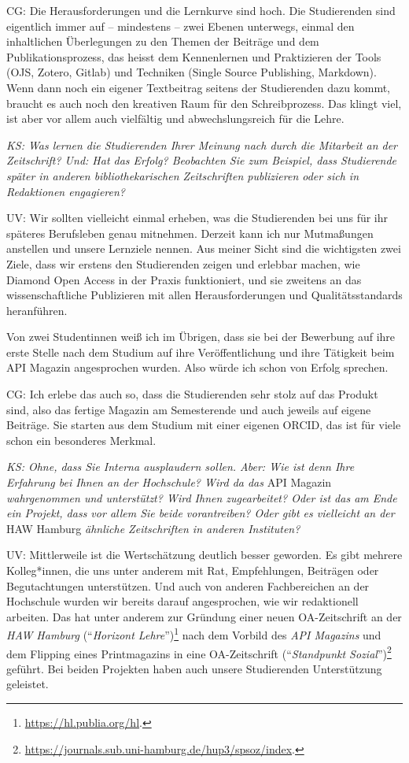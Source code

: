 \documentclass[a4paper,
fontsize=11pt,
oneside,
numbers=noperiodatend,
parskip=half-,
bibliography=totoc,
final
]{scrartcl}
\begin{document}
CG: Die Herausforderungen und die Lernkurve sind hoch. Die Studierenden
sind eigentlich immer auf -- mindestens -- zwei Ebenen unterwegs, einmal
den inhaltlichen Überlegungen zu den Themen der Beiträge und dem
Publikationsprozess, das heisst dem Kennenlernen und Praktizieren der
Tools (OJS, Zotero, Gitlab) und Techniken (Single Source Publishing,
Markdown). Wenn dann noch ein eigener Textbeitrag seitens der
Studierenden dazu kommt, braucht es auch noch den kreativen Raum für den
Schreibprozess. Das klingt viel, ist aber vor allem auch vielfältig und
abwechslungsreich für die Lehre.

\emph{KS: Was lernen die Studierenden Ihrer Meinung nach durch die
Mitarbeit an der Zeitschrift? Und: Hat das Erfolg? Beobachten Sie zum
Beispiel, dass Studierende später in anderen bibliothekarischen
Zeitschriften publizieren oder sich in Redaktionen engagieren?}

UV: Wir sollten vielleicht einmal erheben, was die Studierenden bei uns
für ihr späteres Berufsleben genau mitnehmen. Derzeit kann ich nur
Mutmaßungen anstellen und unsere Lernziele nennen. Aus meiner Sicht sind
die wichtigsten zwei Ziele, dass wir erstens den Studierenden zeigen und
erlebbar machen, wie Diamond Open Access in der Praxis funktioniert, und
sie zweitens an das wissenschaftliche Publizieren mit allen
Herausforderungen und Qualitätsstandards heranführen.

Von zwei Studentinnen weiß ich im Übrigen, dass sie bei der Bewerbung
auf ihre erste Stelle nach dem Studium auf ihre Veröffentlichung und
ihre Tätigkeit beim API Magazin angesprochen wurden. Also würde ich
schon von Erfolg sprechen.

CG: Ich erlebe das auch so, dass die Studierenden sehr stolz auf das
Produkt sind, also das fertige Magazin am Semesterende und auch jeweils
auf eigene Beiträge. Sie starten aus dem Studium mit einer eigenen
ORCID, das ist für viele schon ein besonderes Merkmal.

\emph{KS: Ohne, dass Sie Interna ausplaudern sollen. Aber: Wie ist denn
Ihre Erfahrung bei Ihnen an der Hochschule? Wird da das} API Magazin
\emph{wahrgenommen und unterstützt? Wird Ihnen zugearbeitet? Oder ist
das am Ende ein Projekt, dass vor allem Sie beide vorantreiben? Oder
gibt es vielleicht an der} HAW Hamburg \emph{ähnliche Zeitschriften in
anderen Instituten?}

UV: Mittlerweile ist die Wertschätzung deutlich besser geworden. Es gibt
mehrere Kolleg*innen, die uns unter anderem mit Rat, Empfehlungen,
Beiträgen oder Begutachtungen unterstützen. Und auch von anderen
Fachbereichen an der Hochschule wurden wir bereits darauf angesprochen,
wie wir redaktionell arbeiten. Das hat unter anderem zur Gründung einer
neuen OA-Zeitschrift an der \emph{HAW Hamburg} (\enquote{\emph{Horizont
Lehre}})\footnote{\url{https://hl.publia.org/hl}.} nach dem Vorbild des
\emph{API Magazins} und dem Flipping eines Printmagazins in eine
OA-Zeitschrift (\enquote{\emph{Standpunkt Sozial}})\footnote{\url{https://journals.sub.uni-hamburg.de/hup3/spsoz/index}.}
geführt. Bei beiden Projekten haben auch unsere Studierenden
Unterstützung geleistet.
\end{document}
